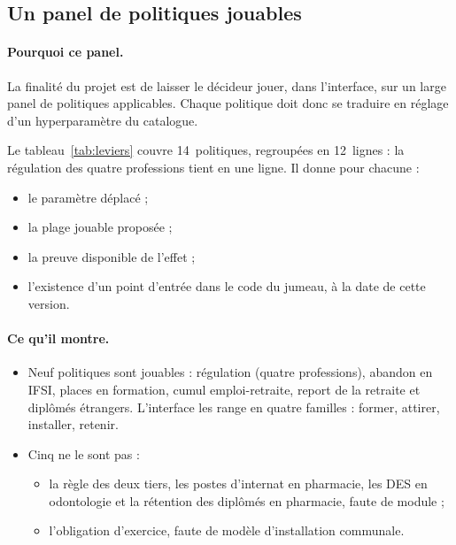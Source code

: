 \documentclass[11pt]{article}
\begin{document}
\subsection{Un panel de politiques jouables}

\paragraph{Pourquoi ce panel.}
La finalité du projet est de laisser le décideur jouer, dans l'interface,
sur un large panel de politiques applicables. Chaque politique doit donc se
traduire en réglage d'un hyperparamètre du catalogue.

Le tableau~\ref{tab:leviers} couvre 14~politiques, regroupées en 12~lignes :
la régulation des quatre professions tient en une ligne. Il donne pour
chacune :
\begin{itemize}
\item le paramètre déplacé ;
\item la plage jouable proposée ;
\item la preuve disponible de l'effet ;
\item l'existence d'un point d'entrée dans le code du jumeau, à la date de
  cette version.
\end{itemize}

\paragraph{Ce qu'il montre.}
\begin{itemize}
\item Neuf politiques sont jouables : régulation (quatre professions),
  abandon en IFSI, places en formation, cumul emploi-retraite, report de la
  retraite et diplômés étrangers. L'interface les range en quatre familles :
  former, attirer, installer, retenir.
\item Cinq ne le sont pas :
  \begin{itemize}
  \item la règle des deux tiers, les postes d'internat en pharmacie, les DES
    en odontologie et la rétention des diplômés en pharmacie, faute de
    module ;
  \item l'obligation d'exercice, faute de modèle d'installation communale.
  \end{itemize}
\end{itemize}
\end{document}
